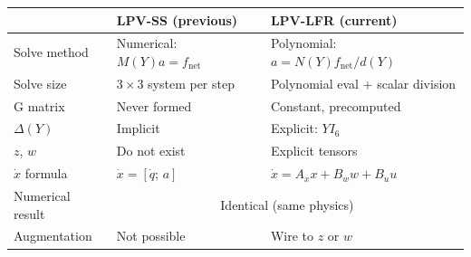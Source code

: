 \documentclass[11pt]{article}
\begin{document}
\begin{center}
\begin{tabular}{lll}
\toprule
 & \textbf{LPV-SS (previous)} & \textbf{LPV-LFR (current)} \\
\midrule
Solve method      & Numerical: $M(Y)a = f_{\mathrm{net}}$         & Polynomial: $a = N(Y)f_{\mathrm{net}}/d(Y)$ \\
Solve size        & $3\times3$ system per step                     & Polynomial eval + scalar division \\
G matrix          & Never formed                                   & Constant, precomputed \\
$\Delta(Y)$       & Implicit                                       & Explicit: $YI_6$ \\
$z$, $w$          & Do not exist                                   & Explicit tensors \\
$\dot{x}$ formula & $\dot{x} = [\dot{q};\, a]$                    & $\dot{x} = A_x x + B_w w + B_u u$ \\
Numerical result  & \multicolumn{2}{c}{Identical (same physics)} \\
Augmentation      & Not possible                                   & Wire to $z$ or $w$ \\
\bottomrule
\end{tabular}
\end{center}
\end{document}
